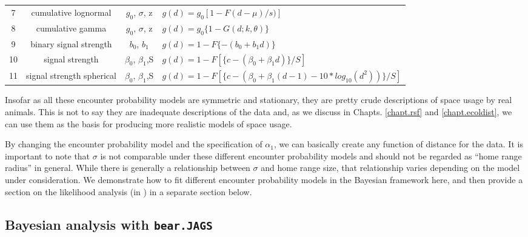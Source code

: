 \begin{table}[ht]
\begin{tabular}{cccl}
7 &cumulative lognormal     & $g_0$, $\sigma$, z & $g(d) = g_0 [1 -F{(d-\mu)/s)}]$  \\
8 &cumulative gamma         & $g_0$, $\sigma$, z  & $g(d) = g_0 \{ 1 - G (d; k,  \theta) \}$  \\
9 &binary signal strength   & $b_0$, $b_1$       & $g(d) = 1 - F \{- (b_0 + b_1 d) \}$ \\
10&signal strength          & $\beta_0$, $\beta_1$,S  &
  $g(d) = 1 - F[ \{c - (\beta_0 + \beta_1 d)\} / S]$  \\
11&signal strength spherical&  $\beta_0$, $\beta_1$,S & 
\parbox[t]{2in}{ $g(d) = 1 - F[\{c - (\beta_0 + \beta_1(d-1)- 10 * log_{10} ( d^2 ) ) \} / S]$ 
} \\ \hline
\end{tabular}
\label{covariates.tab.detmodels}
\end{table}


Insofar as all these encounter probability models
are symmetric and stationary, they are pretty
crude descriptions of space usage by real animals. This is not to
say they are inadequate descriptions of the data and, as we discuss in
Chapts. \ref{chapt.rsf} and \ref{chapt.ecoldist}, we can use them as the
basis for producing more realistic models of space usage.  

By changing the encounter probability model
and the specification of
$\alpha_1$, we can basically create any function of distance for the
data. It is important to note that $\sigma$ is not comparable under
these different encounter probability models
and should not be
regarded as ``home range radius'' in general.  While there is
generally a relationship between $\sigma$ and home range size, that
relationship varies depending on the model under consideration. We
demonstrate how to fit different encounter probability models
 in the Bayesian
framework here, and then provide a section on the likelihood analysis
(in \secr) in a separate section below.

\subsection{Bayesian analysis with {\tt bear.JAGS}}

